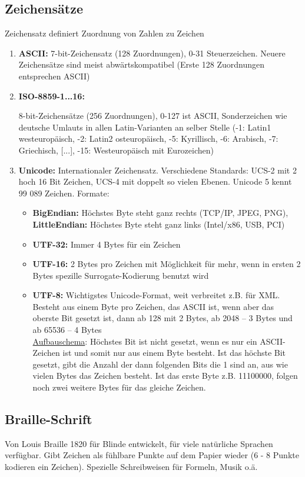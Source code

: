 \documentclass[12pt,landscape]{article}
\begin{document}
\begin{multicols}{3}
\subsection{Zeichensätze}
Zeichensatz definiert Zuordnung von Zahlen zu Zeichen
\begin{enumerate}
\item \textbf{ASCII:} 7-bit-Zeichensatz (128 Zuordnungen), 0-31 Steuerzeichen. Neuere Zeichensätze sind meist abwärtskompatibel (Erste 128 Zuordnungen entsprechen ASCII)
\item \hypertarget{latin}{\textbf{ISO-8859-1...16:}} 8-bit-Zeichensätze (256 Zuordnungen), 0-127 ist ASCII, Sonderzeichen wie deutsche Umlauts in allen Latin-Varianten an selber Stelle (-1: Latin1 westeuropäisch, -2: Latin2 osteuropäisch, -5: Kyrillisch, -6: Arabisch, -7: Griechisch, [...], -15: Westeuropäisch mit Eurozeichen)
\item \textbf{Unicode:} Internationaler Zeichensatz. Verschiedene Standards: UCS-2 mit 2 hoch 16 Bit Zeichen, UCS-4 mit doppelt so vielen Ebenen. Unicode 5 kennt 99 089 Zeichen. Formate:
\begin{itemize}
\item \textbf{BigEndian:} Höchstes Byte steht ganz rechts (TCP/IP, JPEG, PNG),\\
\textbf{LittleEndian:} Höchstes Byte steht ganz links (Intel/x86, USB, PCI)
\item \textbf{UTF-32:} Immer 4 Bytes für ein Zeichen
\item \textbf{UTF-16:} 2 Bytes pro Zeichen mit Möglichkeit für mehr, wenn in ersten 2 Bytes spezille Surrogate-Kodierung benutzt wird
\item \textbf{UTF-8:} Wichtigstes Unicode-Format, weit verbreitet z.B. für XML. Besteht aus einem Byte pro Zeichen, das ASCII ist, wenn aber das oberste Bit gesetzt ist, dann ab 128 mit 2 Bytes, ab 2048 -- 3 Bytes und ab 65536 -- 4 Bytes\\ \underline{Aufbauschema}: Höchstes Bit ist nicht gesetzt, wenn es nur ein ASCII-Zeichen ist und somit nur aus einem Byte besteht. Ist das höchste Bit gesetzt, gibt die Anzahl der dann folgenden Bits die 1 sind an, aus wie vielen Bytes das Zeichen besteht. Ist das erste Byte z.B. 11100000, folgen noch zwei weitere Bytes für das gleiche Zeichen. 
\end{itemize}
\end{enumerate}
\subsection{Braille-Schrift}
Von Louis Braille 1820 für Blinde entwickelt, für viele natürliche Sprachen verfügbar. Gibt Zeichen als fühlbare Punkte auf dem Papier wieder (6 - 8 Punkte kodieren ein Zeichen). Spezielle Schreibweisen für Formeln, Musik o.ä.

\end{multicols}
\end{document}
